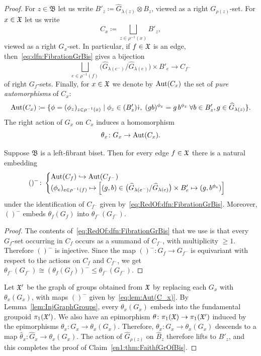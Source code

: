 \documentclass{amsart}
\begin{document}
\begin{proof}
  For $z\in\mathfrak B$ let us write $B'_z\coloneqq\widehat G_{\lambda(z)}\otimes
  B_z$, viewed as a right $G_{\rho(z)}$-set. For $x\in {\mathfrak X}$ let us write
  \[C_x\coloneqq\bigsqcup_{z\in\rho^{-1}(x)}B'_z,
  \]
  viewed as a right $G_x$-set. In particular, if $f\in{\mathfrak X}$ is an edge,
  then~\eqref{eq:dfn:FibrationGrBis} gives a bijection
  \begin{equation}\label{eq:RedOf:dfn:FibrationGrBis}
    \bigsqcup_{e\in\rho^{-1}(f)}\big(\widehat G_{\lambda(e^-)}/\widehat
    G_{\lambda(e)}\big)\times B'_e\to C_{f^-}
  \end{equation}
  of right $G_f$-sets. Finally, for $x\in{\mathfrak X}$ we denote by $\operatorname{Aut}(C_x)$ the
  set of \emph{pure automorphisms} of $C_x$:
  \[\operatorname{Aut}(C_x)\coloneqq \{\phi=(\phi_z)_{z\in\rho^{-1}(x)}\mid
  \phi_z\in(B'_z){\stackrel{\downarrow}{\smash.}},\;(g b)^{\phi_z}=g\,b^{\phi_z}\;\forall b\in B'_z,
  g\in \widehat G_{\lambda(z)}\}.
  \]
  The right action of $G_x$ on $C_x$ induces a homomorphism
  \[\theta_x\colon G_{x}\to\operatorname{Aut}(C_x).\]

  \begin{lem}\label{lem:Aut(C_x)}
    Suppose $\mathfrak B$ is a left-fibrant biset. Then for every edge
    $f\in {\mathfrak X}$ there is a natural embedding
    \begin{equation}\label{eq:lem:Aut(C_x)}
      ()^-\colon\begin{cases}\operatorname{Aut}(C_f) \hookrightarrow \operatorname{Aut}(C_{f^-})\\
        (\phi_e)_{e\in\rho^{-1}(f)} \mapsto  \left[(g,b)\in\big(\widehat G_{\lambda(e^-)}/\widehat
    G_{\lambda(e)}\big)\times B'_e\mapsto(g,b^{\phi_e})\right]
      \end{cases}
    \end{equation}
    under the identification of $C_{f^-}$ given
    by~\eqref{eq:RedOf:dfn:FibrationGrBis}. Moreover, $()^-$ embeds
    $\theta_f(G_f)$ into $\theta_{f^-}(G_{f^-})$.
  \end{lem}
  \begin{proof}
    The contents of~\eqref{eq:RedOf:dfn:FibrationGrBis} that we use is that
    every $G_f$-set occurring in $C_f$ occurs as a summand of $C_{f^-}$,
    with multiplicity $\ge1$. Therefore $()^-$ is injective. Since the map
    $()^-\colon G_f\to G_{f^-}$ is equivariant with respect to the actions
    on $C_f$ and $C_{f^-}$, we get $\theta_{f^-}(G_{f^-})\cong (\theta_f(G_f))^-\le
    \theta_{f^-}(G_{f^-})$.
  \end{proof}
 
  Let ${\mathfrak X}'$ be the graph of groups obtained from ${\mathfrak X}$ by replacing each
  $G_x$ with $\theta_{x}(G_x)$, with maps $()^-$ given
  by~\eqref{eq:lem:Aut(C_x)}. By Lemma~\ref{lem:InjGraphGroups}, every
  $\theta_{x}(G_x)$ embeds into the fundamental groupoid $\pi_1({\mathfrak X}')$. We
  also have an epimorphism $\theta\colon\pi_1({\mathfrak X})\to\pi_1({\mathfrak X}')$ induced
  by the epimorphisms $\theta_x\colon G_x\to\theta_x(G_x)$.  Therefore,
  $\theta_x\colon G_x\to\theta_x(G_x)$ descends to a map $\widehat
  \theta_x\colon \widehat G_x\to\theta_x(G_x)$. The action of $\widehat
  G_{\rho(z)}$ on $\widehat B_z$ therefore lifts to $B'_z$, and this
  completes the proof of Claim~\eqref{en1:thm:FaithfGrOfBis}.


\end{proof}
\end{document}
